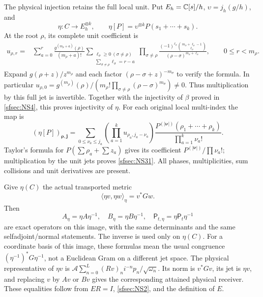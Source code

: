The physical injection retains the full local unit.
Put $E_h=\mathbb C[s]/h$, $\upsilon=j_h(g/h)$, and
\begin{equation}\tag{NS29}\label{sfsec:NS29}
\eta:C\longrightarrow E_h^{\otimes k},\qquad
\eta[P]=\upsilon^{\otimes k}P(s_1+\cdots+s_k).
\end{equation}
At the root $\rho$, its complete unit coefficient is
\begin{equation}\tag{NS30}\label{sfsec:NS30}
\begin{split}
u_{\rho,r}
={}&\sum_{a=0}^r
\frac{g^{(m_\rho+a)}(\rho)}{(m_\rho+a)!}
\sum_{\substack{\ell_\sigma\geq0\ (\sigma\ne\rho)\\
                 \sum_{\sigma\ne\rho}\ell_\sigma=r-a}}
\prod_{\sigma\ne\rho}
\frac{(-1)^{\ell_\sigma}
 \binom{m_\sigma+\ell_\sigma-1}{\ell_\sigma}}
 {(\rho-\sigma)^{m_\sigma+\ell_\sigma}},
\qquad 0\leq r<m_\rho .
\end{split}
\end{equation}
Expand $g(\rho+z)/z^{m_\rho}$ and each factor
$(\rho-\sigma+z)^{-m_\sigma}$ to verify the formula.
In particular
$u_{\rho,0}=g^{(m_\rho)}(\rho)/
(m_\rho!\prod_{\sigma\ne\rho}(\rho-\sigma)^{m_\sigma})\ne0$.
Thus multiplication by this full jet is invertible.
Together with the injectivity of $\beta$ proved in
\eqref{sfsec:NS4}, this proves injectivity of $\eta$.
For each original local multi-index the map is
\begin{equation}\tag{NS31}\label{sfsec:NS31}
(\eta[P])_{\boldsymbol\rho,\boldsymbol j}
=\sum_{0\leq\nu_a\leq j_a}
 \left(\prod_{a=1}^k u_{\rho_a,j_a-\nu_a}\right)
 \frac{P^{(|\boldsymbol\nu|)}(\rho_1+\cdots+\rho_k)}
      {\prod_{a=1}^k\nu_a!}.
\end{equation}
Taylor's formula for $P(\sum\rho_a+\sum z_a)$ gives its
coefficient $P^{(|\boldsymbol\nu|)}/\prod\nu_a!$;
multiplication by the unit jets proves \eqref{sfsec:NS31}.
All phases, multiplicities, sum collisions and unit
derivatives are present.

Give $\eta(C)$ the actual transported metric
\[
\langle\eta v,\eta w\rangle_\eta=v^*Gw.
\]
Then
\begin{equation}\tag{NS32}\label{sfsec:NS32}
A_\eta=\eta A\eta^{-1},\quad
B_\eta=\eta B\eta^{-1},\quad
\mathsf P_{t,\eta}=\eta\mathsf P_t\eta^{-1}
\end{equation}
are exact operators on this image, with the same
determinants and the same selfadjoint/normal statements.
The inverse is used only on $\eta(C)$.
For a coordinate basis of this image, these formulas
mean the usual congruence $(\eta^{-1})^*G\eta^{-1}$,
not a Euclidean Gram on a different jet space.
The physical representative of $\eta v$ is
$\mathcal A\sum_{n=0}^L (Rv)_n i^{-n}p_n/\sqrt{\omega_n}$.
Its norm is $v^*Gv$, its jet is $\eta v$, and replacing
$v$ by $Av$ or $Bv$ gives the corresponding attained
physical receiver. These equalities follow from
$ER=I$, \eqref{sfsec:NS2}, and the definition of $E$.

